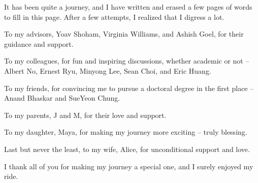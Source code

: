 It has been quite a journey, and I have written and erased a few pages of words to fill in this page. After a few attempts, I realized that I digress a lot. 

To my advisors, Yoav Shoham, Virginia Williams, and Ashish Goel, for their guidance and support. 

To my colleagues, for fun and inspiring discussions, whether academic or not -- Albert No, Ernest Ryu, Minyong Lee, Sean Choi, and Eric Huang. 

To my friends, for convincing me to pursue a doctoral degree in the first place -- Anand Bhaskar and SueYeon Chung. 

To my parents, J and M, for their love and support. 

To my daughter, Maya, for making my journey more exciting -- truly blessing. 

Last but never the least, to my wife, Alice, for unconditional support and love.

I thank all of you for making my journey a special one, and I surely enjoyed my ride. 

%
%



